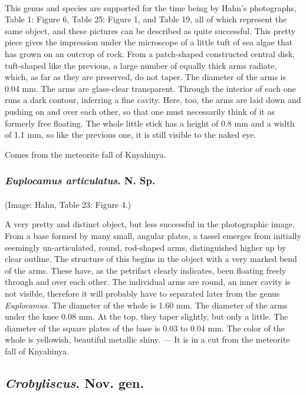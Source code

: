 \documentclass[a4paper, 12pt, oneside]{article}
\begin{document}
\paragraph{}
This genus and species are supported for the time being by Hahn's photographs, Table 1: Figure 6, Table 25: Figure 1, and Table 19, all of which represent the same object, and these pictures can be described as quite successful. This pretty piece gives the impression under the microscope of a little tuft of sea algae that has grown on an outcrop of rock. From a patch-shaped constructed central disk, tuft-shaped like the previous, a large number of equally thick arms radiate, which, as far as they are preserved, do not taper. The diameter of the arms is 0.04 mm. The arms are glass-clear transparent. Through the interior of each one runs a dark contour, inferring a fine cavity. Here, too, the arms are laid down and pushing on and over each other, so that one must necessarily think of it as formerly free floating. The whole little stick has a height of 0.8 mm and a width of 1.1 mm, so like the previous one, it is still visible to the naked eye.

Comes from the meteorite fall of Knyahinya.
\subsubsection{\emph{Euplocamus articulatus}. N. Sp.}
\paragraph{}
(Image: Hahn, Table 23: Figure 4.)

A very pretty and distinct object, but less successful in the photographic image. From a base formed by many small, angular plates, a tassel emerges from initially seemingly un-articulated, round, rod-shaped arms, distinguished higher up by clear outline. The structure of this begins in the object with a very marked bend of the arms. These have, as the petrifact clearly indicates, been floating freely through and over each other. The individual arms are round, an inner cavity is not visible, therefore it will probably have to separated later from the genus \emph{Euplocamus}. The diameter of the whole is 1.60 mm. The diameter of the arms under the knee 0.08 mm. At the top, they taper slightly, but only a little. The diameter of the square plates of the base is 0.03 to 0.04 mm. The color of the whole is yellowish, beautiful metallic shiny. --- It is in a cut from the meteorite fall of Knyahinya.
\subsection{\emph{Crobyliscus}. Nov. gen.}
\end{document}

